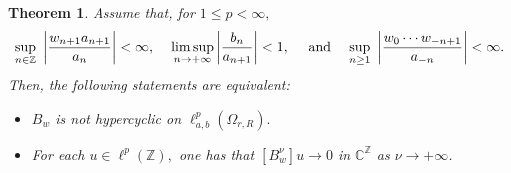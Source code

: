 \documentclass[12pt, reqno]{amsart}
\newtheorem{theorem}{Theorem}[section]
\theoremstyle{definition}
\theoremstyle{remark}
\numberwithin{equation}{section}
\begin{document}
\begin{theorem}\label{T}
    Assume that, for $1\leq p<\infty,$ 
    \begin{equation}\label{yy}
\sup_{n\in \mathbb{Z}}~\left\lvert\frac{ w_{n+1}a_{n+1}}{a_{n}}\right\rvert<\infty, \hspace{.4cm} \limsup_{n\rightarrow +\infty}\left \lvert \frac{b_{n}}{a_{n+1}}\right \rvert<1,~~~~ \text{and} \hspace{.4cm} \sup_{n\geq 1}~\left\lvert\frac{ w_{0}\cdots w_{-n+1}}{a_{-n}}\right\rvert<\infty.
\end{equation}
Then, the following statements are equivalent:
      \begin{itemize}
          \item[(i)] $B_{w}$ is not hypercyclic on $\ell^p_{a,b}(\Omega_{r,R}).$
             \item[(ii)] For each $u \in \ell^p(\mathbb{Z}),$ one has that $[B_{w}^{\nu}]u\to 0$ in $\mathbb{C}^{\mathbb{Z}}$ as $\nu\to +\infty$.
      \end{itemize}
\end{theorem}
\end{document}
